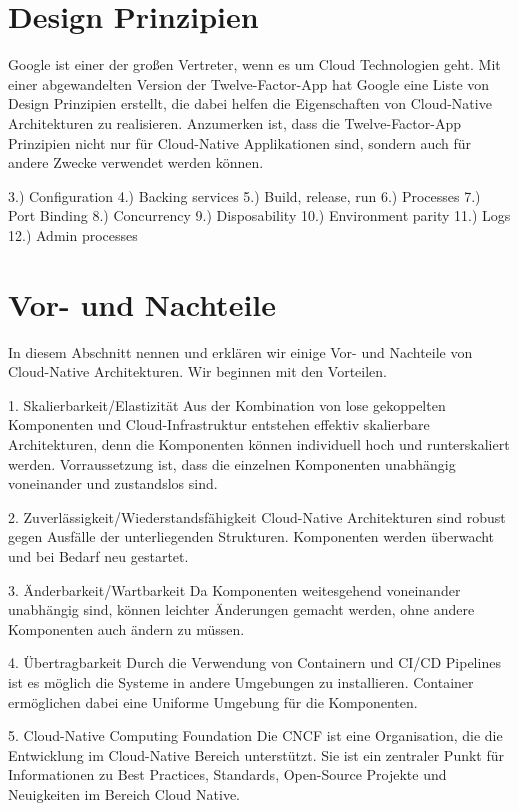 \section{Design Prinzipien}
Google ist einer der großen Vertreter, wenn es um Cloud Technologien geht. Mit einer abgewandelten Version der Twelve-Factor-App hat Google eine Liste von Design Prinzipien erstellt, die dabei helfen die Eigenschaften von Cloud-Native Architekturen zu realisieren. Anzumerken ist, dass die Twelve-Factor-App Prinzipien nicht nur für Cloud-Native Applikationen sind, sondern auch für andere Zwecke verwendet werden können.


3.) Configuration
4.) Backing services
5.) Build, release, run
6.) Processes
7.) Port Binding
8.) Concurrency
9.) Disposability
10.) Environment parity
11.) Logs
12.) Admin processes

\section{Vor- und Nachteile}
In diesem Abschnitt nennen und erklären wir einige Vor- und Nachteile von Cloud-Native Architekturen. Wir beginnen mit den Vorteilen.

1. Skalierbarkeit/Elastizität
Aus der Kombination von lose gekoppelten Komponenten und Cloud-Infrastruktur entstehen effektiv skalierbare Architekturen, denn die Komponenten können individuell hoch und runterskaliert werden. Vorraussetzung ist, dass die einzelnen Komponenten unabhängig voneinander und zustandslos sind.

2. Zuverlässigkeit/Wiederstandsfähigkeit
Cloud-Native Architekturen sind robust gegen Ausfälle der unterliegenden Strukturen. Komponenten werden überwacht und bei Bedarf neu gestartet.

3. Änderbarkeit/Wartbarkeit
Da Komponenten weitesgehend voneinander unabhängig sind, können leichter Änderungen gemacht werden, ohne andere Komponenten auch ändern zu müssen.

4. Übertragbarkeit
Durch die Verwendung von Containern und CI/CD Pipelines ist es möglich die Systeme in andere Umgebungen zu installieren. Container ermöglichen dabei eine Uniforme Umgebung für die Komponenten.

5. Cloud-Native Computing Foundation
Die CNCF ist eine Organisation, die die Entwicklung im Cloud-Native Bereich unterstützt. Sie ist ein zentraler Punkt für Informationen zu Best Practices, Standards, Open-Source Projekte und Neuigkeiten im Bereich Cloud Native.

